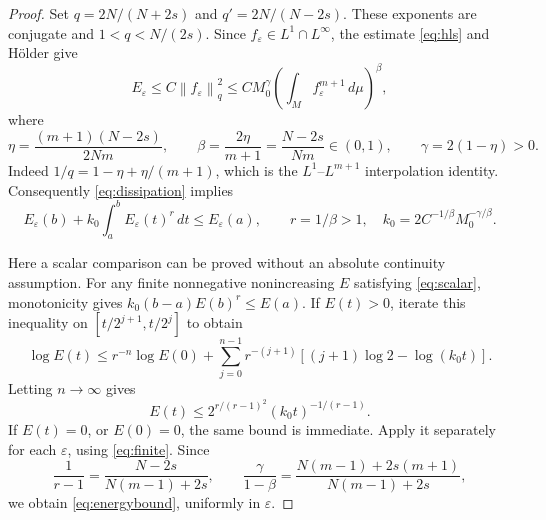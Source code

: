 \documentclass[11pt]{article}
\theoremstyle{definition}
\theoremstyle{remark}
\newcommand{\dd}{\,d\mu}
\newcommand{\norm}[1]{\left\|#1\right\|}
\newcommand{\intM}{\int_M}
\begin{document}
\begin{proof}
Set \(q=2N/(N+2s)\) and \(q'=2N/(N-2s)\).
These exponents are conjugate and \(1<q<N/(2s)\).
Since \(f_\varepsilon\in L^1\cap L^\infty\), the estimate
\eqref{eq:hls} and Hölder give
\[
 E_\varepsilon\le C\norm{f_\varepsilon}_q^2
 \le C M_0^\gamma
       \left(\intM f_\varepsilon^{m+1}\dd\right)^\beta ,
\]
where
\[
 \eta=\frac{(m+1)(N-2s)}{2Nm},\qquad
 \beta=\frac{2\eta}{m+1}=\frac{N-2s}{Nm}\in(0,1),
 \qquad\gamma=2(1-\eta)>0 .
\]
Indeed \(1/q=1-\eta+\eta/(m+1)\), which is the
\(L^1\)--\(L^{m+1}\) interpolation identity.
Consequently \eqref{eq:dissipation} implies
\begin{equation}\label{eq:scalar}
 E_\varepsilon(b)+k_0\int_a^bE_\varepsilon(t)^r\,dt
 \le E_\varepsilon(a),\qquad
 r=1/\beta>1,\quad
 k_0=2C^{-1/\beta}M_0^{-\gamma/\beta}.
\end{equation}

Here a scalar comparison can be proved without an absolute
continuity assumption. For any finite nonnegative nonincreasing
\(E\) satisfying \eqref{eq:scalar}, monotonicity gives
\(k_0(b-a)E(b)^r\le E(a)\).
If \(E(t)>0\), iterate this inequality on
\([t/2^{j+1},t/2^j]\) to obtain
\[
 \log E(t)\le r^{-n}\log E(0)
 +\sum_{j=0}^{n-1}r^{-(j+1)}
       [(j+1)\log2-\log(k_0t)].
\]
Letting \(n\to\infty\) gives
\[
 E(t)\le2^{r/(r-1)^2}(k_0t)^{-1/(r-1)}.
\]
If \(E(t)=0\), or \(E(0)=0\), the same bound is immediate.
Apply it separately for each \(\varepsilon\), using
\eqref{eq:finite}. Since
\[
 \frac1{r-1}=\frac{N-2s}{N(m-1)+2s},\qquad
 \frac{\gamma}{1-\beta}
 =\frac{N(m-1)+2s(m+1)}{N(m-1)+2s},
\]
we obtain \eqref{eq:energybound}, uniformly in \(\varepsilon\).
\end{proof}
\end{document}
